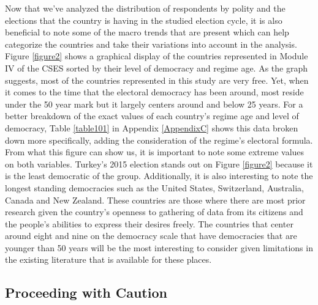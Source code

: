 \documentclass[12pt, titlepage]{article}
\begin{document}
Now that we've analyzed the distribution of respondents by polity and the elections that the country is having in the studied election cycle, it is also beneficial to note some of the macro trends that are present which can help categorize the countries and take their variations into account in the analysis. Figure \ref{figure2} shows a graphical display of the countries represented in Module IV of the CSES sorted by their level of democracy and regime age. As the graph suggests, most of the countries represented in this study are very free. Yet, when it comes to the time that the electoral democracy has been around, most reside under the 50 year mark but it largely centers around and below 25 years. For a better breakdown of the exact values of each country's regime age and level of democracy, Table \ref{table101} in Appendix \ref{AppendixC} shows this data broken down more specifically, adding the consideration of the regime's electoral formula. From what this figure can show us, it is important to note some extreme values on both variables. Turkey's 2015 election stands out on Figure \ref{figure2} because it is the least democratic of the group. Additionally, it is also interesting to note the longest standing democracies such as the United States, Switzerland, Australia, Canada and New Zealand. These countries are those where there are most prior research given the country's openness to gathering of data from its citizens and the people's abilities to express their desires freely. The countries that center around eight and nine on the democracy scale that have democracies that are younger than 50 years will be the most interesting to consider given limitations in the existing literature that is available for these places.

\subsection{Proceeding with Caution}
\end{document}

